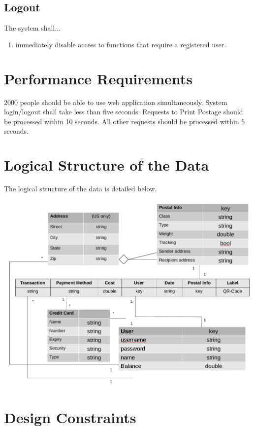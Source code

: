 \documentclass{scrreprt}
\begin{document}
\subsection{Logout}

The system shall...

\begin{enumerate}
\item immediately disable access to functions that require a registered user.
\end{enumerate}

\section{Performance Requirements}

2000 people should be able to use web application simultaneously. System
login/logout shall take less than five seconds. Requests to Print Postage
should be processed within 10 seconds. All other requests should be processed
within 5 seconds.

\section{Logical Structure of the Data}

The logical structure of the data is detailed below.

\includegraphics[scale=.4]{3-4-data-structure.png}

\section{Design Constraints}
\end{document}
